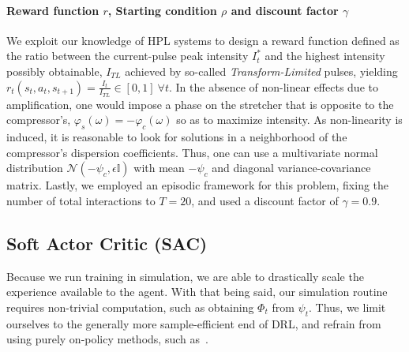 \paragraph{Reward function $r$, Starting condition $\rho$ and discount factor $\gamma$}
We exploit our knowledge of HPL systems to design a reward function defined as the ratio between the current-pulse peak intensity $I_t^*$ and the highest intensity possibly obtainable, $I_{TL}$ achieved by so-called \emph{Transform-Limited} pulses, yielding \(r_t(s_t, a_t, s_{t+1}) = \frac{I_t}{I_{TL}} \in [0,1] \ \forall t \). In the absence of non-linear effects due to amplification, one would impose a phase on the stretcher that is opposite to the compressor's, $\varphi_s(\omega) = - \varphi_c(\omega)$ so as to maximize intensity. As non-linearity is induced, it is reasonable to look for solutions in a neighborhood of the compressor's dispersion coefficients. Thus, one can use a multivariate normal distribution $\mathcal N(-\psi_c, \epsilon \mathbb I)$ with mean $-\psi_c$ and diagonal variance-covariance matrix. Lastly, we employed an episodic framework for this problem, fixing the number of total interactions to $T=20$, and used a discount factor of $\gamma=0.9$.

\subsection{Soft Actor Critic (SAC)}
Because we run training in simulation, we are able to drastically scale the experience available to the agent. With that being said, our simulation routine requires non-trivial computation, such as obtaining \( \Phi_t \) from \( \psi_t \). Thus, we limit ourselves to the generally more sample-efficient end of DRL, and refrain from using purely on-policy methods, such as~\cite{schulman2015trust, schulman2017proximal}.

